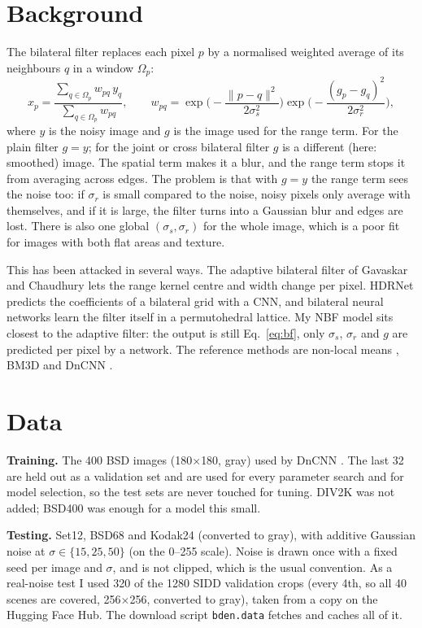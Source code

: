 \documentclass[11pt,a4paper]{article}
\begin{document}
\section{Background}

The bilateral filter \cite{tomasi98} replaces each pixel $p$ by a normalised weighted average of its
neighbours $q$ in a window $\Omega_p$:
\begin{equation}
\hat{x}_p = \frac{\sum_{q\in\Omega_p} w_{pq}\, y_q}{\sum_{q\in\Omega_p} w_{pq}}, \qquad
w_{pq} = \exp\!\Big(-\frac{\|p-q\|^2}{2\sigma_s^2}\Big)\exp\!\Big(-\frac{(g_p-g_q)^2}{2\sigma_r^2}\Big),
\label{eq:bf}
\end{equation}
where $y$ is the noisy image and $g$ is the image used for the range term. For the plain filter $g=y$; for
the joint or cross bilateral filter $g$ is a different (here: smoothed) image. The spatial term makes it a
blur, and the range term stops it from averaging across edges. The problem is that with $g=y$ the range term
sees the noise too: if $\sigma_r$ is small compared to the noise, noisy pixels only average with themselves,
and if it is large, the filter turns into a Gaussian blur and edges are lost. There is also one global
$(\sigma_s, \sigma_r)$ for the whole image, which is a poor fit for images with both flat areas and texture.

This has been attacked in several ways. The adaptive bilateral filter of Gavaskar and Chaudhury
\cite{gavaskar19} lets the range kernel centre and width change per pixel. HDRNet \cite{gharbi17} predicts
the coefficients of a bilateral grid with a CNN, and bilateral neural networks \cite{jampani16} learn the
filter itself in a permutohedral lattice. My NBF model sits closest to the adaptive filter: the output is
still Eq.~\ref{eq:bf}, only $\sigma_s$, $\sigma_r$ and $g$ are predicted per pixel by a network. The
reference methods are non-local means \cite{buades05}, BM3D \cite{dabov07} and DnCNN \cite{zhang17}.

\section{Data}

\textbf{Training.} The 400 BSD images (180$\times$180, gray) used by DnCNN \cite{zhang17}. The last 32 are
held out as a validation set and are used for every parameter search and for model selection, so the test
sets are never touched for tuning. DIV2K was not added; BSD400 was enough for a model this small.

\textbf{Testing.} Set12, BSD68 and Kodak24 (converted to gray), with additive Gaussian noise at
$\sigma\in\{15,25,50\}$ (on the 0--255 scale). Noise is drawn once with a fixed seed per image and
$\sigma$, and is not clipped, which is the usual convention. As a real-noise test I used 320 of the 1280
SIDD validation crops \cite{sidd18} (every 4th, so all 40 scenes are covered, 256$\times$256, converted to
gray), taken from a copy on the Hugging Face Hub. The download script \texttt{bden.data} fetches and
caches all of it.
\end{document}

